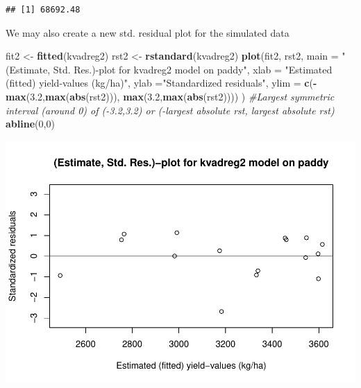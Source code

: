 \documentclass[
]{article}
\newenvironment{Shaded}{\begin{snugshade}}{\end{snugshade}}
\newcommand{\CommentTok}[1]{\textcolor[rgb]{0.56,0.35,0.01}{\textit{#1}}}
\newcommand{\DataTypeTok}[1]{\textcolor[rgb]{0.13,0.29,0.53}{#1}}
\newcommand{\DecValTok}[1]{\textcolor[rgb]{0.00,0.00,0.81}{#1}}
\newcommand{\FloatTok}[1]{\textcolor[rgb]{0.00,0.00,0.81}{#1}}
\newcommand{\KeywordTok}[1]{\textcolor[rgb]{0.13,0.29,0.53}{\textbf{#1}}}
\newcommand{\NormalTok}[1]{#1}
\newcommand{\OperatorTok}[1]{\textcolor[rgb]{0.81,0.36,0.00}{\textbf{#1}}}
\newcommand{\StringTok}[1]{\textcolor[rgb]{0.31,0.60,0.02}{#1}}
\begin{document}
\begin{verbatim}
## [1] 68692.48
\end{verbatim}

We may also create a new std. residual plot for the simulated data

\begin{Shaded}
\begin{Highlighting}[]
\NormalTok{fit2 <-}\StringTok{ }\KeywordTok{fitted}\NormalTok{(kvadreg2)}
\NormalTok{rst2 <-}\StringTok{ }\KeywordTok{rstandard}\NormalTok{(kvadreg2)}
\KeywordTok{plot}\NormalTok{(fit2, rst2, }\DataTypeTok{main =} \StringTok{"(Estimate, Std. Res.)-plot for kvadreg2 model on paddy"}\NormalTok{, }\DataTypeTok{xlab =} \StringTok{"Estimated (fitted) yield-values (kg/ha)"}\NormalTok{, }\DataTypeTok{ylab =}\StringTok{"Standardized residuals"}\NormalTok{, }\DataTypeTok{ylim =} \KeywordTok{c}\NormalTok{(}\OperatorTok{-}\KeywordTok{max}\NormalTok{(}\FloatTok{3.2}\NormalTok{,}\KeywordTok{max}\NormalTok{(}\KeywordTok{abs}\NormalTok{(rst2))), }\KeywordTok{max}\NormalTok{(}\FloatTok{3.2}\NormalTok{,}\KeywordTok{max}\NormalTok{(}\KeywordTok{abs}\NormalTok{(rst2)))) ) }\CommentTok{#Largest symmetric interval (around 0) of (-3.2,3.2) or (-largest absolute rst, largest absolute rst)}
\KeywordTok{abline}\NormalTok{(}\DecValTok{0}\NormalTok{,}\DecValTok{0}\NormalTok{)}
\end{Highlighting}
\end{Shaded}

\begin{center}\includegraphics{matstatproblems20-21_files/figure-latex/unnamed-chunk-53-1} \end{center}
\end{document}
